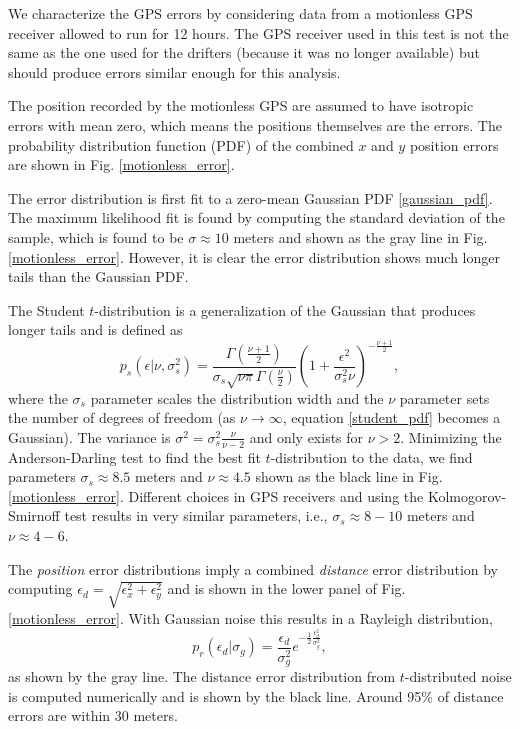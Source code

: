 \documentclass{ametsoc}
\begin{document}
We characterize the GPS errors by considering data from a motionless GPS receiver allowed to run for 12 hours. The GPS receiver used in this test is not the same as the one used for the drifters (because it was no longer available) but should produce errors similar enough for this analysis.

The position recorded by the motionless GPS are assumed to have isotropic errors with mean zero, which means the positions themselves are the errors. The probability distribution function (PDF) of the combined $x$ and $y$ position errors are shown in Fig. \ref{motionless_error}.

The error distribution is first fit to a zero-mean Gaussian PDF \eqref{gaussian_pdf}.
The maximum likelihood fit is found by computing the standard deviation of the sample, which is found to be $\sigma \approx 10$ meters and shown as the gray line in Fig. \ref{motionless_error}. However, it is clear the error distribution shows much longer tails than the Gaussian PDF.

The Student $t$-distribution is a generalization of the Gaussian that produces longer tails and is defined as 
\begin{equation}
\label{student_pdf}
p_s\left(\epsilon |\nu,\sigma_s^2\right) = \frac{\Gamma\left( \frac{\nu + 1}{2} \right)}{\sigma_s \sqrt{\nu \pi} \Gamma\left(\frac{\nu}{2}\right)} \left( 1 + \frac{\epsilon^2}{\sigma_s^2 \nu} \right)^{-\frac{\nu+1}{2}},
\end{equation}
where the $\sigma_s$ parameter scales the distribution width and the $\nu$ parameter sets the number of degrees of freedom (as $\nu \rightarrow \infty$, equation \ref{student_pdf} becomes a Gaussian). The variance is $\sigma^2=\sigma_s^2 \frac{\nu}{\nu-2}$ and only exists for $\nu > 2$. Minimizing the Anderson-Darling test to find the best fit $t$-distribution to the data, we find parameters $\sigma_s \approx 8.5$ meters and $\nu \approx 4.5$ shown as the black line in Fig. \ref{motionless_error}. Different choices in GPS receivers and using the Kolmogorov-Smirnoff test results in very similar parameters, i.e., $\sigma_s\approx8-10$ meters and $\nu\approx4-6$.

The \emph{position} error distributions imply a combined \emph{distance} error distribution by computing $\epsilon_d = \sqrt{\epsilon_x^2 + \epsilon_y^2}$ and is shown in the lower panel of Fig. \ref{motionless_error}. With Gaussian noise this results in a Rayleigh distribution,
\begin{equation}
\label{rayleigh_pdf}
p_r(\epsilon_d|\sigma_g) = \frac{\epsilon_d}{\sigma_g^2 } e^{-\frac{1}{2}\frac{\epsilon_d^2}{\sigma_g^2}},
\end{equation}
as shown by the gray line.
The distance error distribution from $t$-distributed noise is computed numerically and is shown by the black line. Around 95\% of distance errors are within $30$ meters.
\end{document}
